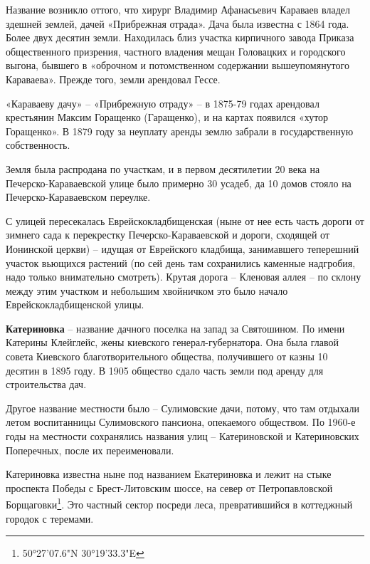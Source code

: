 Название возникло оттого, что хирург Владимир Афанасьевич Караваев владел здешней землей, дачей «Прибрежная отрада». Дача была известна с 1864 года. Более двух десятин земли. Находилась близ участка кирпичного завода Приказа общественного призрения, частного владения мещан Головацких и городского выгона, бывшего в «оброчном и потомственном содержании вышеупомянутого Караваева». Прежде того, земли арендовал Гессе.
 
«Караваеву дачу» – «Прибрежную отраду» – в 1875-79 годах арендовал крестьянин Максим Горащенко (Гаращенко), и на картах появился «хутор Горащенко». В 1879 году за неуплату аренды землю забрали в государственную собственность.

Земля была распродана по участкам, и в первом десятилетии 20 века на Печерско-Карава\-евской улице было примерно 30 усадеб, да 10 домов стояло на Печерско-Карава\-евском переулке.

С улицей пересекалась Еврейскокладбищенская (ныне от нее есть часть дороги от зимнего сада к перекрестку Печерско-Караваевской и дороги, сходящей от Ионинской церкви) – идущая от Еврейского кладбища, занимавшего теперешний участок вьющихся растений (по сей день там сохранились каменные надгробия, надо только внимательно смотреть). Крутая дорога – Кленовая аллея – по склону между этим участком и небольшим хвойничком это было начало Еврейскокладбищенской улицы.\\

\medskip

\textbf{Катериновка} – название дачного поселка на запад за Святошином. По имени Катерины Клейглейс, жены киевского генерал-губерна\-тора. Она была главой совета Киевского благотворительного общества, получившего от казны 10 десятин в 1895 году. В 1905 общество сдало часть земли под аренду для строительства дач.

Другое название местности было – Сулимовские дачи, потому, что там отдыхали летом воспитанницы Сулимовского пансиона, опекаемого обществом. По 1960-е годы на местности сохранялись названия улиц – Катериновской и Катериновских Поперечных, после их переименовали. 

Катериновка известна ныне под названием Екатериновка и лежит на стыке проспекта Победы с Брест-Литовским шоссе, на север от Петропавловской Борщаговки\footnote{50°27'07.6"N 30°19'33.3"E}. Это частный сектор посреди леса, превратившийся в коттеджный городок с теремами.\\

\medskip

